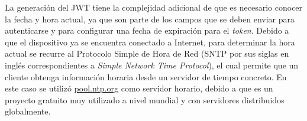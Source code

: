 
La generación del JWT tiene la complejidad adicional de que es necesario conocer la fecha y hora actual, ya que son parte de los campos que se deben enviar para autenticarse y para configurar una fecha de expiración para el \emph{token}. Debido a que el dispositivo ya se encuentra conectado a Internet, para determinar la hora actual se recurre al Protocolo Simple de Hora de Red (SNTP por sus siglas en inglés correspondientes a \emph{Simple Network Time Protocol}), el cual permite que un cliente obtenga información horaria desde un servidor de tiempo concreto. En este caso se utilizó \url{pool.ntp.org} como servidor horario, debido a que es un proyecto gratuito muy utilizado a nivel mundial y con servidores distribuidos globalmente. 


















